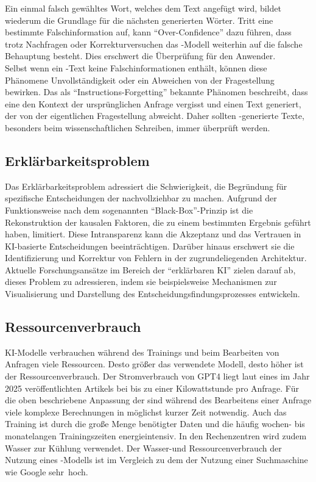 \documentclass[../main.tex]{subfiles}
\begin{document}
Ein einmal falsch gewähltes Wort, welches dem Text angefügt wird, bildet wiederum die Grundlage für die nächsten generierten Wörter. Tritt eine bestimmte Falschinformation auf, 
kann "`Over-Confidence"' dazu führen, dass trotz Nachfragen oder Korrekturversuchen das -Modell weiterhin auf die falsche Behauptung besteht. Dies erschwert die 
Überprüfung für den Anwender.\cite{allgemHalluzinationen,softmax} \\
Selbst wenn ein -Text keine Falschinformationen enthält, können diese Phänomene Unvollständigkeit oder ein Abweichen von der Fragestellung bewirken. Das als 
"`Instructions-Forgetting"' bekannte Phänomen beschreibt, dass eine  den Kontext der ursprünglichen Anfrage vergisst und einen Text generiert, der von der 
eigentlichen Fragestellung abweicht. Daher sollten -generierte Texte, besonders beim wissenschaftlichen Schreiben, immer überprüft werden.\cite{allgemHalluzinationen}


\subsection{Erklärbarkeitsproblem}
\label{sec:erklärbarkeitsproblem}

Das Erklärbarkeitsproblem adressiert die Schwierigkeit, die Begründung für spezifische Entscheidungen der  nachvollziehbar zu machen. Aufgrund der Funktionsweise nach dem sogenannten 
"`Black-Box"'-Prinzip ist die Rekonstruktion der kausalen Faktoren, die zu einem bestimmten Ergebnis geführt haben, limitiert. Diese Intransparenz kann die Akzeptanz und das Vertrauen in 
KI-basierte Entscheidungen beeinträchtigen. Darüber hinaus erschwert sie die Identifizierung und Korrektur von Fehlern in der zugrundeliegenden Architektur. Aktuelle Forschungsansätze 
im Bereich der "`erklärbaren KI"' zielen darauf ab, dieses Problem zu adressieren, indem sie beispielsweise Mechanismen zur Visualisierung und Darstellung des 
Entscheidungsfindungsprozesses entwickeln.\cite{explainable}
 

\subsection{Ressourcenverbrauch}

KI-Modelle verbrauchen während des Trainings und beim Bearbeiten von Anfragen viele Ressourcen. Desto größer das verwendete Modell, desto höher ist der Ressourcenverbrauch. 
Der Stromverbrauch von GPT4 liegt laut eines im Jahr 2025 veröffentlichten Artikels bei bis zu einer Kilowattstunde pro Anfrage\cite{Energieverbrauch}. Für die oben beschriebene Anpassung der  sind während des Bearbeitens einer Anfrage viele 
komplexe Berechnungen in möglichst kurzer Zeit notwendig. Auch das Training ist durch die große Menge benötigter Daten und die häufig wochen- bis monatelangen Trainingszeiten 
energieintensiv. In den Rechenzentren wird zudem Wasser zur Kühlung verwendet. Der Wasser-und Ressourcenverbrauch der Nutzung eines -Modells ist im Vergleich zu dem der Nutzung einer 
Suchmaschine wie Google \mbox{sehr hoch\cite{KINachhaltigkeit}.} 
\end{document}
